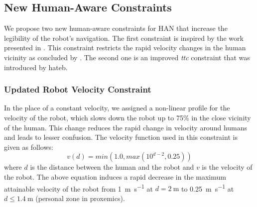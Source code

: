 \subsection{New Human-Aware Constraints}
We propose two new human-aware constraints for HAN that increase the legibility of the robot's navigation. The first constraint is inspired by the work presented in \cite{kruse2014evaluating}. This constraint restricts the rapid velocity changes in the human vicinity as concluded by \cite{kruse2014evaluating}. The second one is an improved \textit{\acrfull{ttc}} constraint that was introduced by \acrshort{hateb}.

\subsubsection{Updated Robot Velocity Constraint}
In the place of a constant velocity, we assigned a non-linear profile for the velocity of the robot, which slows down the robot up to 75\% in the close vicinity of the human. This change reduces the rapid change in velocity around humans and leads to lesser confusion. The velocity function used in this constraint is given as follows:
\begin{equation}
    v(d) = min(1.0,max(10^{d-2},0.25))
    \label{vel_eq}
\end{equation}
where $d$ is the distance between the human and the robot and $v$ is the velocity of the robot. The above equation induces a rapid decrease in the maximum attainable velocity of the robot from \SI[per-mode=symbol]{1}{\metre\per\second} at $d=\SI{2}{\metre}$ to \SI[per-mode=symbol]{0.25}{\metre\per\second} at $d \leq \SI{1.4}{\metre}$ (personal zone in proxemics).

